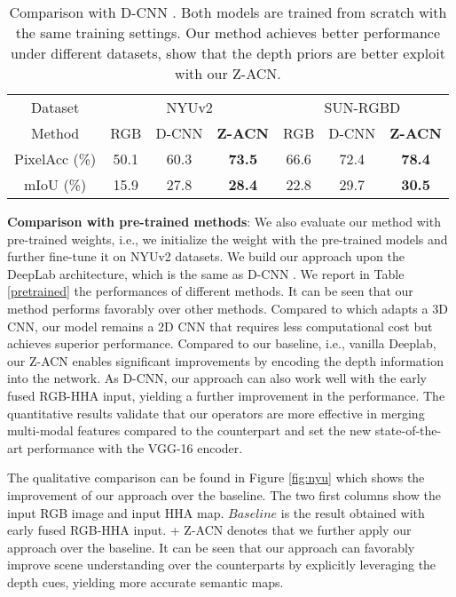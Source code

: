 \documentclass[lettersize,journal]{IEEEtran}
\begin{document}
\begin{table}[t]
\centering
\setlength\tabcolsep{3pt}
\setlength\extrarowheight{0pt}
\caption{Comparison with D-CNN \cite{Wang2018DCNN}. Both models are trained from scratch with the same training settings. Our method achieves better performance under different datasets, show that the depth priors are better exploit with our Z-ACN.}
\begin{tabular}[ht]{ c c c c | c c c}
\hline
Dataset & \multicolumn{3}{c|}{NYUv2} & \multicolumn{3}{c}{SUN-RGBD} \\
Method  & RGB & D-CNN &  \textbf{Z-ACN} & RGB & D-CNN &  \textbf{Z-ACN} \\
\hline
PixelAcc (\%)& 50.1& 60.3 & \textbf{73.5} &66.6 & 72.4  & \textbf{78.4}  \\
mIoU (\%)& 15.9& 27.8 & \textbf{28.4} & 22.8 & 29.7  & \textbf{30.5}  \\
\hline
\end{tabular}

\label{compdcnn}
\end{table}

\textbf{Comparison with pre-trained methods}: We also evaluate our method with pre-trained weights, i.e., we initialize the weight with the pre-trained models and further fine-tune it on NYUv2 datasets. We build our approach upon the DeepLab architecture, which is the same as D-CNN \cite{Wang2018DCNN}. We report in Table \ref{pretrained} the performances of different methods. It can be seen that our method performs favorably over other methods. Compared to \cite{Qi2017Graph} which adapts a 3D CNN, our model remains a 2D CNN that requires less computational cost but achieves superior performance. Compared to our baseline, i.e., vanilla Deeplab, our Z-ACN enables significant improvements by encoding the depth information into the network. As D-CNN, our approach can also work well with the early fused RGB-HHA input, yielding a further improvement in the performance. The quantitative results validate that our operators are more effective in merging multi-modal features compared to the counterpart and set the new state-of-the-art performance with the VGG-16 encoder. 

The qualitative comparison can be found in Figure \ref{fig:nyu} which shows the improvement of our approach over the baseline. The two first columns show the input RGB image and input HHA map. $Baseline$ is the result obtained with early fused RGB-HHA input. + Z-ACN denotes that we further apply our approach over the baseline. It can be seen that our approach can favorably improve scene understanding over the counterparts by explicitly leveraging the depth cues, yielding more accurate semantic maps.
\end{document}
